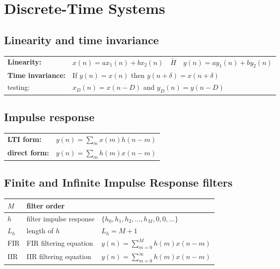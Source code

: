 \section{Discrete-Time Systems}
\subsection{Linearity and time invariance}
\begin{tabular}{ll}
\textbf{Linearity:} & $x(n) = ax_1(n) + bx_2(n) \quad \underrightarrow{H} \quad y(n) = ay_1(n) + by_2(n)$\\
\textbf{Time invariance:} & If $y(n) = x(n)$ then $y(n+\delta) = x(n+\delta)$\\
testing: & $x_D(n)=x(n-D)$ and $y_D(n)=y(n-D)$\\
\end{tabular}

\subsection{Impulse response}
\begin{tabular}{ll}
	\textbf{LTI form:}		& $y(n) = \sum\limits_m x(m)h(n-m)$ \\
	\textbf{direct form:}	& $y(n) = \sum\limits_m h(m)x(n-m)$
\end{tabular}


\subsection{Finite and Infinite Impulse Response filters}
\begin{tabularx}{0.75\textwidth}{|l|X|X|}
	\hline
	$M$	& filter order				& 
	\\ \hline
	$h$	& filter impulse response	& $\{ h_0, h_1, h_2, \ldots , h_M, 0, 0, \ldots\}$
	\\ \hline
	$L_h$	& length of $h$			& $L_h = M + 1$
	\\ \hline
	FIR		& FIR filtering equation	& $y(n) = \sum\limits_{m=0}^{M} h(m)x(n-m)$
	\\ \hline
	IIR		& IIR filtering equation	& $y(n) = \sum\limits_{m=0}^{\infty} h(m)x(n-m)$
	\\ \hline
\end{tabularx}

